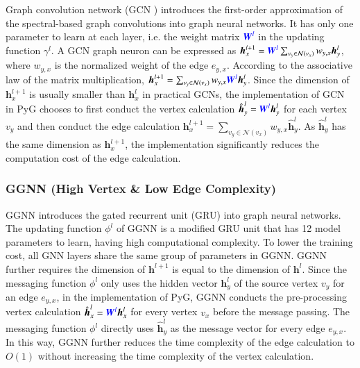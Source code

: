 Graph convolution network (GCN \cite{kipf2017_gcn}) introduces the first-order approximation of the spectral-based graph convolutions into graph neural networks.
%
It has only one parameter to learn at each layer, i.e. the weight matrix $\textcolor{blue}{\boldsymbol{W}^l}$ in the updating function $\gamma^l$.
%
A GCN graph neuron can be expressed as $\boldsymbol{h}^{l+1}_x = \textcolor{blue}{\boldsymbol{W}^l}\sum_{v_y \in \mathcal{N}(v_x)}{w_{y,x}\boldsymbol{h}^l_y}$, where $w_{y,x}$ is the normalized weight of the edge $e_{y,x}$.
%
According to the associative law of the matrix multiplication, $\boldsymbol{h}^{l+1}_x = \sum_{v_y \in \mathcal{N}(v_x)}{w_{y,x}\textcolor{blue}{\boldsymbol{W}^l}\boldsymbol{h}^l_y}$.
%
Since the dimension of $\boldsymbol{h}^{l+1}_x$ is usually smaller than $\boldsymbol{h}^l_x$ in practical GCNs, the implementation of GCN in PyG chooses to first conduct the vertex calculation $\hat{\boldsymbol{h}}^l_y = \textcolor{blue}{\boldsymbol{W}^l}\boldsymbol{h}^l_y$ for each vertex $v_y$ and then conduct the edge calculation $\boldsymbol{h}^{l+1}_x=\sum_{v_y\in\mathcal{N}(v_x)}{w_{y,x}\hat{\boldsymbol{h}}^l_y}$.
%
As $\hat{\boldsymbol{h}}^l_y$ has the same dimension as $\boldsymbol{h}^{l+1}_x$, the implementation significantly reduces the  computation cost of the edge calculation.

\subsubsection{GGNN (High Vertex \& Low Edge Complexity)}

GGNN \cite{li2015_ggnn} introduces the gated recurrent unit (GRU) into graph neural networks.
%
The updating function $\phi^l$ of GGNN is a modified GRU unit that has 12 model parameters to learn, having high computational complexity.
%
To lower the training cost, all GNN layers share the same group of parameters in GGNN.
%
GGNN further requires the dimension of $\boldsymbol{h}^{l+1}$ is equal to the dimension of $\boldsymbol{h}^l$.
%
Since the messaging function $\phi^l$ only uses the hidden vector $\boldsymbol{h}^l_y$ of the source vertex $v_y$ for an edge $e_{y,x}$, in the implementation of PyG, GGNN conducts the pre-processing vertex calculation $\hat{\boldsymbol{h}}^l_x = \textcolor{blue}{\boldsymbol{W}^l}\boldsymbol{h}^l_x$ for every vertex $v_x$ before the message passing.
%
The messaging function $\phi^l$ directly uses $\hat{\boldsymbol{h}}^l_y$ as the message vector for every edge $e_{y, x}$.
%
In this way, GGNN further reduces the time complexity of the edge calculation to $O(1)$ without increasing the time complexity of the vertex calculation.

